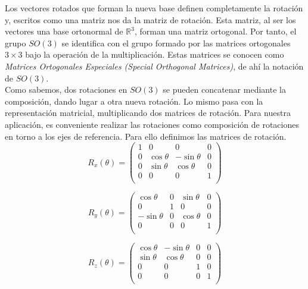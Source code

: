 Los vectores rotados que forman la nueva base definen completamente la rotación
y, escritos como una matriz nos da la matriz de rotación. Esta matriz, al ser
los vectores una base ortonormal de $\mathbb{R}^3$, forman una matriz ortogonal.
Por tanto, el grupo $SO(3)$ se identifica con el grupo formado por las matrices
ortogonales $3\times 3$ bajo la operación de la multiplicación. Estas matrices
se conocen como \textit{Matrices Ortogonales Especiales (Special Orthogonal
Matrices)}, de ahí la notación de $SO(3)$. \\

Como sabemos, dos rotaciones en $SO(3)$ se pueden concatenar mediante la
composición, dando lugar a otra nueva rotación. Lo mismo pasa con la
representación matricial, multiplicando dos matrices de rotación. Para nuestra
aplicación, es conveniente realizar las rotaciones como composición de
rotaciones en torno a los ejes de referencia. Para ello definimos las matrices
de rotación. \\

\begin{equation}
	R_x(\theta) =
	\left(	
		\begin{array}{cccc}
			1 & 0 & 0 & 0 \\				
			0 & \cos{\theta} & -\sin{\theta} & 0 \\				
			0 & \sin{\theta} & \cos{\theta} & 0 \\				
			0 & 0 & 0 & 1 \\				
		\end{array}
	\right)
\end{equation}

\begin{equation}
	R_y(\theta) =
	\left(	
		\begin{array}{cccc}
			\cos{\theta} & 0 & \sin{\theta} & 0 \\				
			0 & 1 & 0 & 0 \\				
			-\sin{\theta} & 0 & \cos{\theta} & 0 \\				
			0 & 0 & 0 & 1 \\				
		\end{array}
	\right)
\end{equation}

\begin{equation}
	R_z(\theta) =
	\left(	
		\begin{array}{cccc}
			\cos{\theta} & -\sin{\theta} & 0 & 0 \\				
			\sin{\theta} & \cos{\theta} & 0 & 0 \\				
			0 & 0 & 1 & 0\\				
			0 & 0 & 0 & 1 \\				
		\end{array}
	\right)
\end{equation} \\

